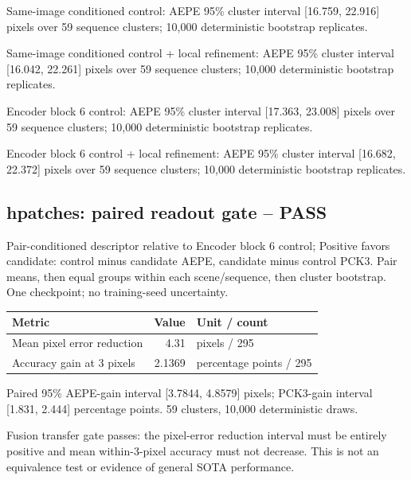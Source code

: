 \documentclass[10pt]{article}
\begin{document}
Same-image conditioned control: AEPE 95\% cluster interval [16.759, 22.916] pixels over 59 sequence clusters; 10,000 deterministic bootstrap replicates.

Same-image conditioned control + local refinement: AEPE 95\% cluster interval [16.042, 22.261] pixels over 59 sequence clusters; 10,000 deterministic bootstrap replicates.

Encoder block 6 control: AEPE 95\% cluster interval [17.363, 23.008] pixels over 59 sequence clusters; 10,000 deterministic bootstrap replicates.

Encoder block 6 control + local refinement: AEPE 95\% cluster interval [16.682, 22.372] pixels over 59 sequence clusters; 10,000 deterministic bootstrap replicates.

\subsection{hpatches: paired readout gate -- PASS}
Pair-conditioned descriptor relative to Encoder block 6 control; Positive favors candidate: control minus candidate AEPE, candidate minus control PCK3. Pair means, then equal groups within each scene/sequence, then cluster bootstrap. One checkpoint; no training-seed uncertainty.
\begin{center}\begin{tabular}{p{.57\linewidth}rp{.23\linewidth}}\toprule Metric & Value & Unit / count \\ \midrule
Mean pixel error reduction & 4.31 & pixels / 295 \\
Accuracy gain at 3 pixels & 2.1369 & percentage points / 295 \\
\bottomrule\end{tabular}\end{center}
Paired 95\% AEPE-gain interval [3.7844, 4.8579] pixels; PCK3-gain interval [1.831, 2.444] percentage points. 59 clusters, 10,000 deterministic draws.

Fusion transfer gate passes: the pixel-error reduction interval must be entirely positive and mean within-3-pixel accuracy must not decrease. This is not an equivalence test or evidence of general SOTA performance.
\end{document}
